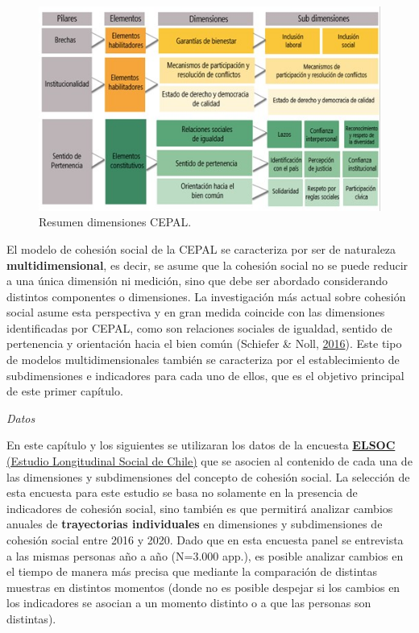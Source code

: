 \documentclass[
  12pt,
]{book}
\begin{document}
\begin{figure}[H]

{\centering \includegraphics[width=1\linewidth,height=1\textheight]{images/dimensiones-cepal} 

}

\caption{Resumen dimensiones CEPAL.}\label{fig:esquema-cepal}
\end{figure}

El modelo de cohesión social de la CEPAL se caracteriza por ser de naturaleza \textbf{multidimensional}, es decir, se asume que la cohesión social no se puede reducir a una única dimensión ni medición, sino que debe ser abordado considerando distintos componentes o dimensiones. La investigación más actual sobre cohesión social asume esta perspectiva y en gran medida coincide con las dimensiones identificadas por CEPAL, como son relaciones sociales de igualdad, sentido de pertenencia y orientación hacia el bien común (Schiefer \& Noll, \protect\hyperlink{ref-schiefer_essentials_2016}{2016}). Este tipo de modelos multidimensionales también se caracteriza por el establecimiento de subdimensiones e indicadores para cada uno de ellos, que es el objetivo principal de este primer capítulo.

\emph{Datos}

En este capítulo y los siguientes se utilizaran los datos de la encuesta \href{https://coes.cl/encuesta-panel/}{\textbf{ELSOC} (Estudio Longitudinal Social de Chile)} que se asocien al contenido de cada una de las dimensiones y subdimensiones del concepto de cohesión social. La selección de esta encuesta para este estudio se basa no solamente en la presencia de indicadores de cohesión social, sino también es que permitirá analizar cambios anuales de \textbf{trayectorias individuales} en dimensiones y subdimensiones de cohesión social entre 2016 y 2020. Dado que en esta encuesta panel se entrevista a las mismas personas año a año (N=3.000 app.), es posible analizar cambios en el tiempo de manera más precisa que mediante la comparación de distintas muestras en distintos momentos (donde no es posible despejar si los cambios en los indicadores se asocian a un momento distinto o a que las personas son distintas).
\end{document}
